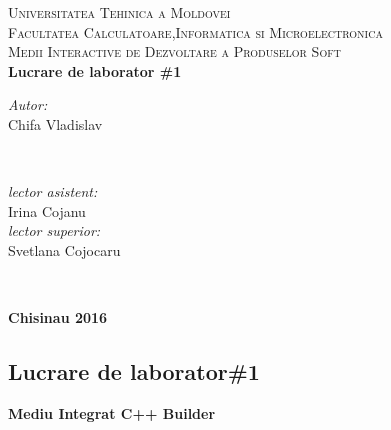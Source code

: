 \documentclass[11pt]{article}
\begin{document}
\begin{titlepage}
\begin{center}


\textsc{\large Universitatea Tehinica a Moldovei}\\[0.5cm]
\textsc{\large Facultatea Calculatoare,Informatica si Microelectronica}\\[0.5cm]
\vspace{25 mm}
\textsc{\large Medii Interactive de Dezvoltare a Produselor Soft}\\[0.5cm]
\textbf{\large Lucrare de laborator \#1}\\[0.5cm]
 \vspace{45 mm}

      \begin{minipage}{0.4\textwidth}
      \begin{flushleft} \large
      \emph{Autor:}\\
      Chifa Vladislav
      \end{flushleft}
      \end{minipage}
      ~
      \begin{minipage}{0.4\textwidth}
      \begin{flushright} \large
      \emph{lector asistent:} \\
      Irina Cojanu \\ 
      \emph{lector superior:}\\
      Svetlana Cojocaru 
      \end{flushright}
      \end{minipage}\\[4cm]

      \vspace{10 mm}
   
      \textbf{\large Chisinau 2016}
     \newpage
       

\end{center}
\end{titlepage}


\begin{center}
   \section*{Lucrare de laborator\#1}
   \textbf{\large Mediu Integrat C++ Builder}\\[0.5cm]
\end{center}
\end{document}
